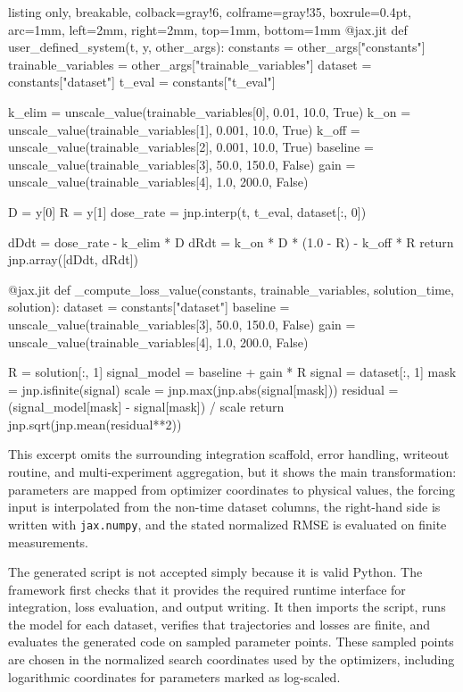 \begin{tcblisting}{
  listing only,
  breakable,
  colback=gray!6,
  colframe=gray!35,
  boxrule=0.4pt,
  arc=1mm,
  left=2mm,
  right=2mm,
  top=1mm,
  bottom=1mm
}
@jax.jit
def user_defined_system(t, y, other_args):
    constants = other_args["constants"]
    trainable_variables = other_args["trainable_variables"]
    dataset = constants["dataset"]
    t_eval = constants["t_eval"]

    k_elim = unscale_value(trainable_variables[0], 0.01, 10.0, True)
    k_on = unscale_value(trainable_variables[1], 0.001, 10.0, True)
    k_off = unscale_value(trainable_variables[2], 0.001, 10.0, True)
    baseline = unscale_value(trainable_variables[3], 50.0, 150.0, False)
    gain = unscale_value(trainable_variables[4], 1.0, 200.0, False)

    D = y[0]
    R = y[1]
    dose_rate = jnp.interp(t, t_eval, dataset[:, 0])

    dDdt = dose_rate - k_elim * D
    dRdt = k_on * D * (1.0 - R) - k_off * R
    return jnp.array([dDdt, dRdt])

@jax.jit
def _compute_loss_value(constants, trainable_variables,
                        solution_time, solution):
    dataset = constants["dataset"]
    baseline = unscale_value(trainable_variables[3], 50.0, 150.0, False)
    gain = unscale_value(trainable_variables[4], 1.0, 200.0, False)

    R = solution[:, 1]
    signal_model = baseline + gain * R
    signal = dataset[:, 1]
    mask = jnp.isfinite(signal)
    scale = jnp.max(jnp.abs(signal[mask]))
    residual = (signal_model[mask] - signal[mask]) / scale
    return jnp.sqrt(jnp.mean(residual**2))
\end{tcblisting}

This excerpt omits the surrounding integration scaffold, error handling,
writeout routine, and multi-experiment aggregation, but it shows the main
transformation: parameters are mapped from optimizer coordinates to physical
values, the forcing input is interpolated from the non-time dataset columns,
the right-hand side is written with \texttt{jax.numpy}, and the stated
normalized RMSE is evaluated on finite measurements.

The generated script is not accepted simply because it is valid Python. The
framework first checks that it provides the required runtime interface for
integration, loss evaluation, and output writing. It then imports the script,
runs the model for each dataset, verifies that trajectories and losses are
finite, and evaluates the generated code on sampled parameter points. These
sampled points are chosen in the normalized search coordinates used by the
optimizers, including logarithmic coordinates for parameters marked as
log-scaled.

